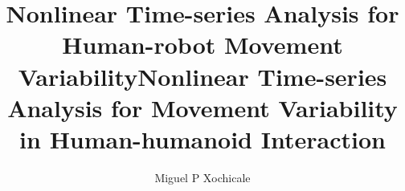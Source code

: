 \title{Nonlinear Time-series Analysis for Human-robot Movement Variability} %
\title{Nonlinear Time-series Analysis for Movement Variability in Human-humanoid Interaction} %




\author{Miguel P Xochicale}





